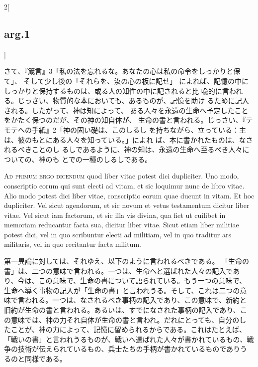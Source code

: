 \documentclass[paper=a4paper,fontsize=10pt,jafontsize=9pt,titlepage]{jlreq}
\begin{document}
\begin{paracol}{2}[\subsection{arg.1}]
\switchcolumn

さて、『箴言』3「私の法を忘れるな。あなたの心は私の命令をしっかりと保て」、
 そして少し後の「それらを、汝の心の板に記せ」
 によれば、記憶の中にしっかりと保持するものは、或る人の知性の中に記されると比
 喩的に言われる。じっさい、物質的な本においても、あるものが、記憶を助け
 るために記入される。したがって、神は知によって、
 ある人々を永遠の生命へ予定したことをかたく保つのだが、その神の知自体が、
 生命の書と言われる。じっさい、『テモテへの手紙』2「神の固い礎は、このしるし
 を持ちながら、立っている：主は、彼のもとにある人々を知っている。」によれ
 ば、本に書かれたものは、なされるべきことのし
 るしであるように、神の知は、永遠の生命へ至るべき人々についての、神のも
 とでの一種のしるしである。

\switchcolumn*[\subsection{ad.1}]

{\scshape Ad primum ergo dicendum} quod liber vitae
 potest dici dupliciter. Uno modo, conscriptio eorum qui sunt electi ad
 vitam, et sic loquimur nunc de libro vitae. Alio modo potest dici liber
 vitae, conscriptio eorum quae ducunt in vitam. Et hoc dupliciter. Vel
 sicut agendorum, et sic novum et vetus testamentum dicitur liber
 vitae. Vel sicut iam factorum, et sic illa vis divina, qua fiet ut
 cuilibet in memoriam reducantur facta sua, dicitur liber vitae. Sicut
 etiam liber militiae potest dici, vel in quo scribuntur electi ad
 militiam, vel in quo traditur ars militaris, vel in quo recitantur
 facta militum.

\switchcolumn

第一異論に対しては、それゆえ、以下のように言われるべきである。
「生命の書」は、二つの意味で言われる。一つは、生命へと選ばれた人々の記入であ
 り、今は、この意味で、生命の書について語られている。もう一つの意味で、
 生命へ導く事物の記入が「生命の書」と言われうる。そして、これは二つの意
 味で言われる。一つは、なされるべき事柄の記入であり、この意味で、新約と
 旧約が生命の書と言われる。あるいは、すでになされた事柄の記入であり、こ
 の意味では、神の力それ自体が生命の書と言われ。だれにとっても、自分のし
 たことが、神の力によって、記憶に留められるからである。これはたとえば、
「戦いの書」と言われうるものが、戦いへ選ばれた人々が書かれているもの、戦
 争の技術が伝えられているもの、兵士たちの手柄が書かれているものでありう
 るのと同様である。

\switchcolumn*[\subsection{ad.2}]


\end{paracol}
\end{document}
